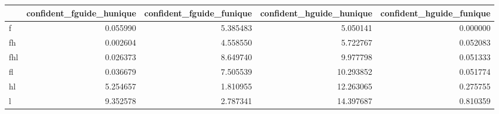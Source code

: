 \begin{tabular}{lrrrr}
\toprule
 & confident_fguide_hunique & confident_fguide_funique & confident_hguide_hunique & confident_hguide_funique \\
\midrule
f & 0.055990 & 5.385483 & 5.050141 & 0.000000 \\
fh & 0.002604 & 4.558550 & 5.722767 & 0.052083 \\
fhl & 0.026373 & 8.649740 & 9.977798 & 0.051333 \\
fl & 0.036679 & 7.505539 & 10.293852 & 0.051774 \\
hl & 5.254657 & 1.810955 & 12.263065 & 0.275755 \\
l & 9.352578 & 2.787341 & 14.397687 & 0.810359 \\
\bottomrule
\end{tabular}
